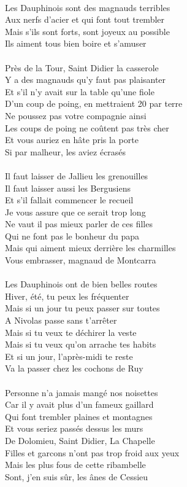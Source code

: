\\Les Dauphinois sont des magnauds terribles
\\Aux nerfs d'acier et qui font tout trembler
\\Mais s'ils sont forts, sont joyeux au possible
\\Ils aiment tous bien boire et s'amuser
\breakpage
\\\\Près de la Tour, Saint Didier la casserole
\\Y a des magnauds qu'y faut pas plaisanter
\\Et s'il n'y avait sur la table qu'une fiole
\\D'un coup de poing, en mettraient 20 par terre
\\Ne poussez pas votre compagnie ainsi
\\Les coups de poing ne coûtent pas très cher
\\Et vous auriez en hâte pris la porte
\\Si par malheur, les aviez écrasés
\\\\Il faut laisser de Jallieu les grenouilles
\\Il faut laisser aussi les Bergusiens
\\Et s'il fallait commencer le recueil
\\Je vous assure que ce serait trop long
\\Ne vaut il pas mieux parler de ces filles
\\Qui ne font pas le bonheur du papa
\\Mais qui aiment mieux derrière les charmilles
\\Vous embrasser, magnaud de Montcarra
\\\\Les Dauphinois ont de bien belles routes
\\Hiver, été, tu peux les fréquenter
\\Mais si un jour tu peux passer sur toutes
\\A Nivolas passe sans t'arrêter
\\Mais si tu veux te déchirer la veste
\\Mais si tu veux qu'on arrache tes habits
\\Et si un jour, l'après-midi te reste
\\Va la passer chez les cochons de Ruy
\\\\Personne n'a jamais mangé nos noisettes
\\Car il y avait plus d'un fameux gaillard
\\Qui font trembler plaines et montagnes
\\Et vous seriez passés dessus les murs
\\De Dolomieu, Saint Didier, La Chapelle
\\Filles et garcons n'ont pas trop froid aux yeux
\\Mais les plus fous de cette ribambelle
\\Sont, j'en suis sûr, les ânes de Cessieu
\breakpage